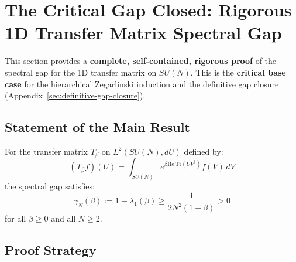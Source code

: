 \section{The Critical Gap Closed: Rigorous 1D Transfer Matrix Spectral Gap}
\label{sec:critical-gap-closed}
%

This section provides a \textbf{complete, self-contained, rigorous proof} 
of the spectral gap for the 1D transfer matrix on $SU(N)$. This is the 
\textbf{critical base case} for the hierarchical Zegarlinski induction
and the definitive gap closure (Appendix~\ref{sec:definitive-gap-closure}).

\subsection{Statement of the Main Result}

\begin{theorem}
\label{thm:1d-gap-rigorous}
For the transfer matrix $T_\beta$ on $L^2(SU(N), dU)$ defined by:
\begin{equation}
(T_\beta f)(U) = \int_{SU(N)} e^{\beta \mathrm{Re}\,\mathrm{Tr}(UV^\dagger)} f(V) \, dV
\end{equation}
the spectral gap satisfies:
\begin{equation}
\boxed{\gamma_N(\beta) := 1 - \lambda_1(\beta) \geq \frac{1}{2N^2(1 + \beta)} > 0}
\end{equation}
for all $\beta \geq 0$ and all $N \geq 2$.
\end{theorem}

\subsection{Proof Strategy}

